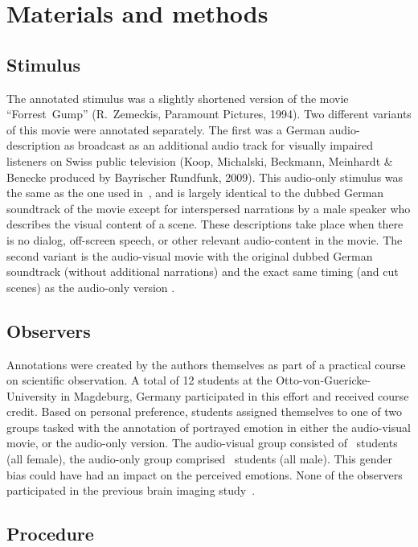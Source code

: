 \documentclass[10pt,a4paper,twocolumn]{article}
\begin{document}
\section*{Materials and methods}

\subsection*{Stimulus}

The annotated stimulus was a slightly shortened version of the movie
``Forrest~Gump'' (R.~Zemeckis, Paramount Pictures, 1994). Two different
variants of this movie were annotated separately. The first was a German
audio-description as broadcast as an additional audio track for visually
impaired listeners on Swiss public television (Koop, Michalski, Beckmann,
Meinhardt \& Benecke produced by Bayrischer Rundfunk, 2009). This audio-only
stimulus was the same as the one used in~\cite{HBI+14}, and is largely
identical to the dubbed German soundtrack of the movie except for interspersed
narrations by a male speaker who describes the visual content of a scene. These
descriptions take place when there is no dialog, off-screen speech, or other
relevant audio-content in the movie. The second variant is the audio-visual
movie with the original dubbed German soundtrack (without additional
narrations) and the exact same timing (and cut scenes) as the audio-only
version \cite[contains instructions on how to reproduce the stimulus from the
DVD release]{HBI+14}.

\subsection*{Observers}

Annotations were created by the authors themselves as part of a practical
course on scientific observation. A total of 12 students at the
Otto-von-Guericke-University in Magdeburg, Germany participated in this effort
and received course credit. Based on personal preference, students assigned
themselves to one of two groups tasked with the annotation of portrayed emotion
in either the audio-visual movie, or the audio-only version. The audio-visual
group consisted of \AVTotalRaters\ students (all female), the audio-only group
comprised \AOTotalRaters\ students (all male). This gender bias could have had
an impact on the perceived emotions. None of the observers participated in the
previous brain imaging study~\cite{HBI+14}.

\subsection*{Procedure}
\end{document}
